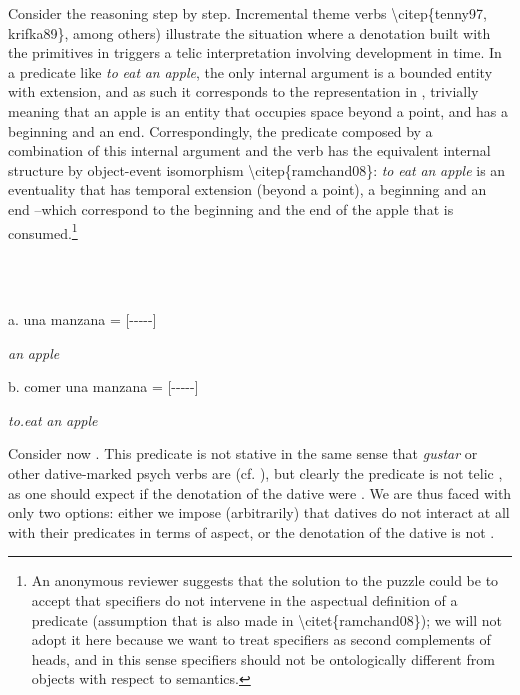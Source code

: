 \documentclass[output=paper,modfonts,nonflat]{langsci/langscibook}
\begin{document}
Consider the reasoning step by step. Incremental theme verbs {\textbackslash}citep\{tenny97, krifka89\}, among others) illustrate the situation where a denotation built with the primitives in  triggers a telic interpretation involving development in time. In a predicate like \textit{to} \textit{eat} \textit{an} \textit{apple}, the only internal argument is a bounded entity with extension, and as such it corresponds to the representation in , trivially meaning that an apple is an entity that occupies space beyond a point, and has a beginning and an end. Correspondingly, the predicate  composed by a combination of this internal argument and the verb has the equivalent internal structure by object-event isomorphism {\textbackslash}citep\{ramchand08\}: \textit{to} \textit{eat} \textit{an} \textit{apple} is an eventuality that has temporal extension (beyond a point), a beginning and an end –which correspond to the beginning and the end of the apple that is consumed.\footnote{An anonymous reviewer suggests that the solution to the puzzle could be to accept that specifiers do not intervene in the aspectual definition of a predicate (assumption that is also made in {\textbackslash}citet\{ramchand08\}); we will not adopt it here because we want to treat specifiers as second complements of heads, and in this sense specifiers should not be ontologically different from objects with respect to semantics.} 

\ea%
    \label{ex:key:18}
    \gll\\
        \\
    \glt
    \z

          a. una manzana       =       [-{}-{}-{}-{}-]

            \textit{an}   \textit{apple}

      b. comer una manzana  =      [-{}-{}-{}-{}-]

          \textit{to.eat}  \textit{an}   \textit{apple}

Consider now . This predicate is not stative in the same sense that \textit{gustar} or other dative-marked psych verbs are (cf. ), but clearly the predicate is not telic , as one should expect if the denotation of the dative  were . We are thus faced with only two options: either we impose (arbitrarily) that datives do not interact at all with their predicates in terms of aspect, or the denotation of the dative is not .
\end{document}
